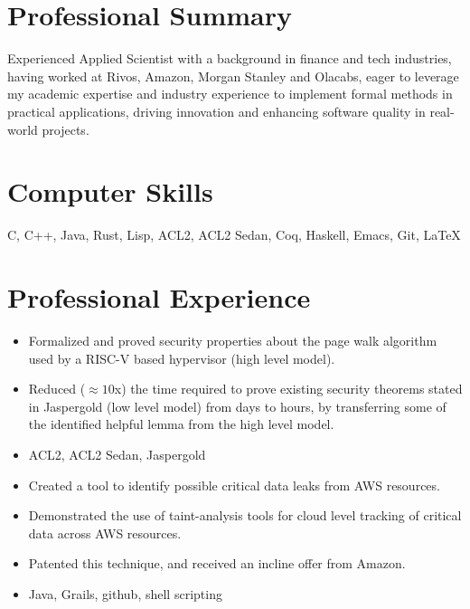 \documentclass[11pt,a4paper,sans]{moderncv}
\begin{document}
\makecvtitle
\vspace{-1cm}
\section{Professional Summary}
Experienced Applied Scientist with a background in finance and tech
industries, having worked at Rivos, Amazon, Morgan Stanley and
Olacabs, eager to leverage my academic expertise and
industry experience to implement formal methods in practical
applications, driving innovation and enhancing software quality in
real-world projects.

\section{Computer Skills}
C, C++, Java, Rust, Lisp, ACL2, ACL2 Sedan, Coq, Haskell, Emacs, Git,
\LaTeX

\section{Professional Experience}
\begin{itemize}
\item Formalized and proved security properties
  about the page walk algorithm used by a RISC-V based hypervisor (high level model).
\item Reduced ($\approx10$x) the time required to prove existing security theorems
  stated in Jaspergold (low level model) from days to hours, by
  transferring some of the identified helpful lemma from the high
  level model.
\item ACL2, ACL2 Sedan, Jaspergold
\end{itemize}
\begin{itemize}
  \item Created a tool to identify possible critical data leaks from
    AWS resources.
  \item Demonstrated the use of taint-analysis tools for cloud
    level tracking of critical data across AWS resources.
  \item Patented this technique, and received an incline offer
    from Amazon. 
  \item Java, Grails, github, shell scripting
\end{itemize}
\end{document}
